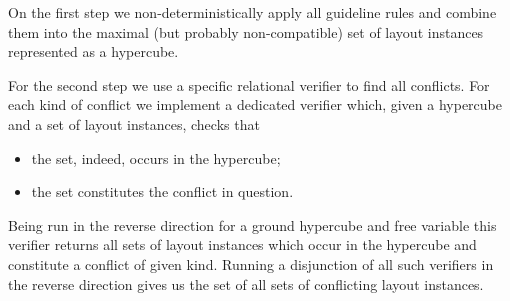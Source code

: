 

On the first step we non-deterministically apply all guideline rules and combine them into the maximal
(but probably non-compatible) set of layout instances represented as a hypercube.

For the second step we use a specific relational verifier to find all conflicts. For each kind of conflict we implement
a dedicated verifier which, given a hypercube and a set of layout instances, checks that

\begin{itemize}
\item the set, indeed, occurs in the hypercube;
\item the set constitutes the conflict in question.
\end{itemize}

Being run in the reverse direction for a ground hypercube and free variable this verifier returns all
sets of layout instances which occur in the hypercube and constitute a conflict of given kind. Running a disjunction
of all such verifiers in the reverse direction gives us the set of all sets of conflicting layout instances.






